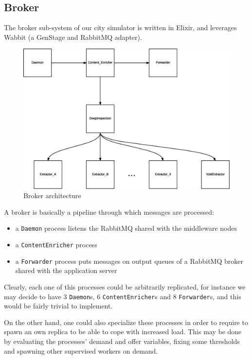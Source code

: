 \subsection{Broker}\label{sec:impl-broker}

The broker sub-system of our city simulator is written in Elixir, and leverages
Wabbit (a GenStage and RabbitMQ adapter).

\begin{figure}[H]
  \centering
  \includegraphics[width=\columnwidth]{images/implementation/broker.eps}
  \caption{Broker architecture}
  \label{fig:broker-arch}
\end{figure}

A broker is basically a pipeline through which messages are processed:

\begin{itemize}
  \item a \texttt{Daemon} process listens the RabbitMQ shared with the
    middleware nodes
  \item a \texttt{ContentEnricher} process 
  \item a \texttt{Forwarder} process puts messages on output queues of a
    RabbitMQ broker shared with the application server
\end{itemize}

Clearly, each one of this processes could be arbitrarily replicated, for
instance we may decide to have 3 \texttt{Daemon}s, 6 \texttt{ContentEnricher}s
and 8 \texttt{Forwarder}s, and this would be fairly trivial to implement.

On the other hand, one could also specialize these processes in order to
require to spawn an own replica to be able to cope with increased load. This
may be done by evaluating the processes' demand and offer variables, fixing
some thresholds and spawning other supervised workers on demand.

